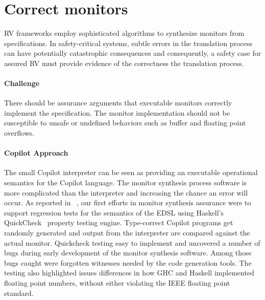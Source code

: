 \section{Correct monitors} \label{sec:codecorrect} 
 RV frameworks employ sophisticated algorithms to synthesize  monitors
 from specifications. In safety-critical systems, subtle errors in the
 translation process can have potentially catastrophic
 consequences and consequently, a safety case for assured RV must
 provide evidence of the correctness the translation process.



\paragraph{Challenge} There should be assurance arguments that
executable monitors correctly implement the specification.  The monitor implementation
should not be susceptible to unsafe or undefined behaviors such as
buffer and floating point overflows. 

\paragraph{Copilot Approach}    
The  small  Copilot interpreter can be seen as providing an executable
operational semantics for the Copilot language. The monitor synthesis
process software is more complicated  than the interpreter and
increasing the chance an error will occur.  As reported
in~\cite{pike-icfp-12} , our first efforts in monitor
synthesis assurance were  to support  regression tests for the semantics
of the EDSL using Haskell's QuickCheck~\cite{qc} property testing
engine. Type-correct Copilot programs get randomly generated and
output from the interpreter are compared against the actual
monitor. Quickcheck testing easy to implement and uncovered 
a number of bugs during early development of the monitor synthesis
software. Among those bugs caught were forgotten witnesses needed by
the code generation tools. The testing also highlighted issues
differences in how GHC and Haskell implemented floating point numbers,
without either violating the IEEE floating point standard. 


